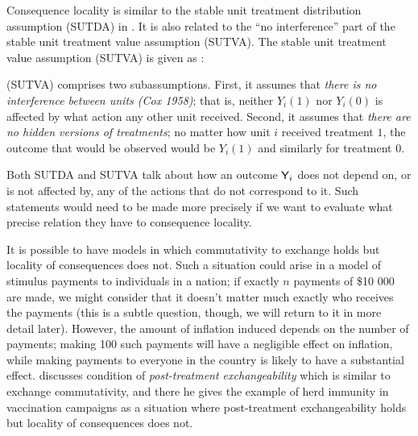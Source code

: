 Consequence locality is similar to the stable unit treatment distribution assumption (SUTDA) in \citet{dawid_decision-theoretic_2020}. It is also related to the ``no interference'' part of the stable unit treatment value assumption (SUTVA). The stable unit treatment value assumption (SUTVA) is given as \citep{rubin_causal_2005}:

\begin{blockquote}
(SUTVA) comprises two subassumptions. First, it assumes that \emph{there is no interference between units (Cox 1958)}; that is, neither $Y_i(1)$ nor $Y_i(0)$ is affected by what action any other unit received. Second, it assumes that \emph{there are no hidden versions of treatments}; no matter how unit $i$ received treatment $1$, the outcome that would be observed would be $Y_i(1)$ and similarly for treatment $0$.
\end{blockquote}

Both SUTDA and SUTVA talk about how an outcome $\mathsf{Y}_i$ does not depend on, or is not affected by, any of the actions that do not correspond to it. Such statements would need to be made more precisely if we want to evaluate what precise relation they have to consequence locality.


It is possible to have models in which commutativity to exchange holds but locality of consequences does not. Such a situation could arise in a model of stimulus payments to individuals in a nation; if exactly $n$ payments of \$10 000 are made, we might consider that it doesn't matter much exactly who receives the payments (this is a subtle question, though, we will return to it in more detail later). However, the amount of inflation induced depends on the number of payments; making 100 such payments will have a negligible effect on inflation, while making payments to everyone in the country is likely to have a substantial effect. \citet{dawid_causal_2000} discusses condition of \emph{post-treatment exchangeability} which is similar to exchange commutativity, and there he gives the example of herd immunity in vaccination campaigns as a situation where post-treatment exchangeability holds but locality of consequences does not.



